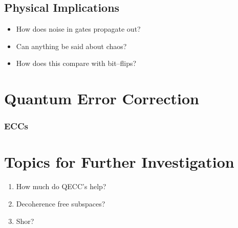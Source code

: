 \subsection{Physical Implications}

\begin{itemize}
\item How does noise in gates propagate out?
\item Can anything be said about chaos?
\item How does this compare with bit--flips?
\end{itemize}



\section{Quantum Error Correction}

\subsubsection{ECCs}

\section{Topics for Further Investigation}

\begin{enumerate}
\item How much do QECC's help?
\item Decoherence free subspaces?
\item Shor?
\end{enumerate}
